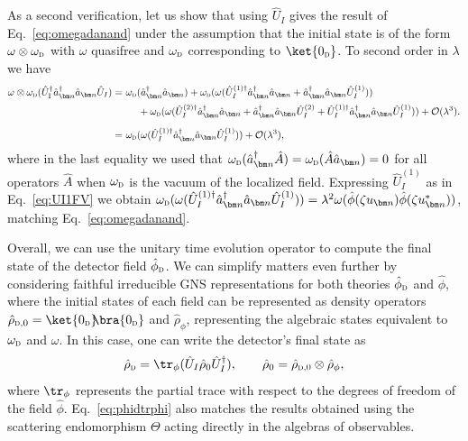 \documentclass[letterpaper,12pt,titlepage,oneside,final]{book}
\renewcommand{\r}{\hat{\rho}}
\newcommand{\tc}[1]{\textsc{#1}}
\begin{document}
As a second verification, let us show that using $\hat{U}_I$ gives the result of Eq.~\eqref{eq:omegadanand} under the assumption that the initial state is of the form $\omega\otimes\omega_\tc{d}$ with $\omega$ quasifree and $\omega_\tc{d}$ corresponding to $\ket{0_\tc{d}}$. To second order in $\lambda$ we have
\begin{align}
    \omega\otimes\omega_\tc{d}(\hat{U}_\tc{I}^\dagger\hat{a}_{\bm n}^\dagger \hat{a}_{\bm n} \hat{U}_I) =&\,\, \omega_\tc{d}(\hat{a}_{\bm n}^\dagger \hat{a}_{\bm n}) + \omega_\tc{d}(\omega(\hat{U}_I^{(1)\dagger}\hat{a}_{\bm n}^\dagger \hat{a}_{\bm n} + \hat{a}_{\bm n}^\dagger \hat{a}_{\bm n}\hat{U}_I^{(1)})) \\[0.5mm]
    &\:\:\:\:\:\:\:+ \omega_\tc{d}(\omega(\hat{U}_I^{(2)\dagger}\hat{a}_{\bm n}^\dagger \hat{a}_{\bm n} + \hat{a}_{\bm n}^\dagger \hat{a}_{\bm n}\hat{U}_I^{(2)}+\hat{U}_I^{(1)\dagger}\hat{a}_{\bm n}^\dagger \hat{a}_{\bm n}\hat{U}_I^{(1)})) + \mathcal{O}(\lambda^3).\nonumber\\[2mm]
    =& \,\, \omega_\tc{d}(\omega(\hat{U}_I^{(1)\dagger}\hat{a}_{\bm n}^\dagger \hat{a}_{\bm n}\hat{U}_I^{(1)})) + \mathcal{O}(\lambda^3)\nonumber,
\end{align}
where in the last equality we used that $\omega_\tc{d}(\hat{a}_{\bm n}^\dagger\hat{A}) = \omega_\tc{d}(\hat{A}\hat{a}_{\bm n}) = 0$ for all operators $\hat{A}$ when $\omega_\tc{d}$ is the vacuum of the localized field. Expressing $\hat{U}_I^{(1)}$ as in Eq.~\eqref{eq:UI1FV} we obtain $\omega_\tc{d}(\omega(\hat{U}_I^{(1)\dagger}\hat{a}_{\bm n}^\dagger \hat{a}_{\bm n}\hat{U}_I^{(1)})) = \lambda^2\omega(\hat{\phi}(\zeta u_{\bm n})\hat{\phi}(\zeta u_{\bm n}^*))$, matching Eq.~\eqref{eq:omegadanand}.


    Overall, we can use the unitary time evolution operator to compute the final state of the detector field $\hat{\phi}_\tc{d}$. We can simplify matters even further by considering faithful irreducible GNS representations for both theories $\hat{\phi}_\tc{d}$ and $\hat{\phi}$, where the initial states of each field can be represented as density operators $\hat{\rho}_{\tc{d},0} = \ket{0_\tc{d}}\!\!\bra{0_\tc{d}}$ and $\hat{\rho}_\phi$, representing the algebraic states equivalent to $\omega_\tc{d}$ and $\omega$. In this case, one can write the detector's final state as
    \begin{equation}\label{eq:phidtrphi}
        \hat{\rho}_{\tc{d}} = \tr_{\phi}(\hat{U}_I\r_0\hat{U}_I^\dagger), \quad \quad \r_0 = \hat{\rho}_{\tc{d,0}}\otimes\hat{\rho}_\phi,
    \end{equation}
    where $\tr_\phi$ represents the partial trace with respect to the degrees of freedom of the field $\hat{\phi}$. Eq.~\eqref{eq:phidtrphi} also matches the results obtained using the scattering endomorphism $\Theta$ acting directly in the algebras of observables.
     
\end{document}
